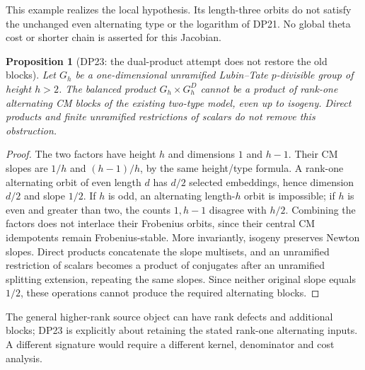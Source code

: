 \documentclass[11pt,a4paper]{article}
\newtheorem{proposition}[theorem]{Proposition}
\theoremstyle{definition}\newtheorem{remark}[theorem]{Remark}
\begin{document}
This example realizes the local hypothesis. Its length-three orbits do not satisfy the unchanged even alternating type or the logarithm of DP21. No global theta cost or shorter chain is asserted for this Jacobian.

\begin{proposition}[DP23: the dual-product attempt does not restore the old blocks]\label{DP23}
Let $G_h$ be a one-dimensional unramified Lubin--Tate $p$-divisible group of height $h>2$. The balanced product $G_h\times G_h^D$ cannot be a product of rank-one alternating CM blocks of the existing two-type model, even up to isogeny. Direct products and finite unramified restrictions of scalars do not remove this obstruction.
\end{proposition}
\begin{proof}
The two factors have height $h$ and dimensions $1$ and $h-1$. Their CM slopes are $1/h$ and $(h-1)/h$, by the same height/type formula. A rank-one alternating orbit of even length $d$ has $d/2$ selected embeddings, hence dimension $d/2$ and slope $1/2$. If $h$ is odd, an alternating length-$h$ orbit is impossible; if $h$ is even and greater than two, the counts $1,h-1$ disagree with $h/2$. Combining the factors does not interlace their Frobenius orbits, since their central CM idempotents remain Frobenius-stable. More invariantly, isogeny preserves Newton slopes. Direct products concatenate the slope multisets, and an unramified restriction of scalars becomes a product of conjugates after an unramified splitting extension, repeating the same slopes. Since neither original slope equals $1/2$, these operations cannot produce the required alternating blocks.
\end{proof}

The general higher-rank source object can have rank defects and additional blocks; DP23 is explicitly about retaining the stated rank-one alternating inputs. A different signature would require a different kernel, denominator and cost analysis.
\end{document}
